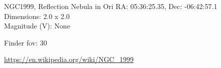 \begin{block}{NGC1999, Reflection Nebula in Ori}
    RA: 05:36:25.35, Dec: -06:42:57.1 \\ 
    Dimensions: 2.0 x 2.0 \\ 
    Magnitude (V): None



    Finder fov: 30 

    \url{https://en.wikipedia.org/wiki/NGC_1999} 
\end{block}